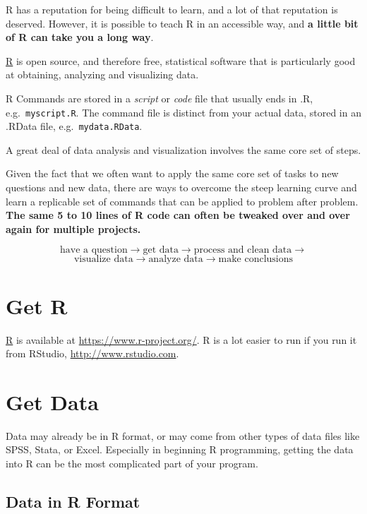 \documentclass[
  letterpaper,
  DIV=11,
  numbers=noendperiod]{scrreprt}
\begin{document}
R has a reputation for being difficult to learn, and a lot of that
reputation is deserved. However, it is possible to teach R in an
accessible way, and \textbf{a little bit of R can take you a long way}.

\href{https://www.r-project.org/}{R} is open source, and therefore free,
statistical software that is particularly good at obtaining, analyzing
and visualizing data.

R Commands are stored in a \emph{script} or \emph{code} file that
usually ends in .R, e.g.~\texttt{myscript.R}. The command file is
distinct from your actual data, stored in an .RData file,
e.g.~\texttt{mydata.RData}.

A great deal of data analysis and visualization involves the same core
set of steps.

Given the fact that we often want to apply the same core set of tasks to
new questions and new data, there are ways to overcome the steep
learning curve and learn a replicable set of commands that can be
applied to problem after problem. \textbf{The same 5 to 10 lines of R
code can often be tweaked over and over again for multiple projects.}

\[\text{have a question} \rightarrow \text{get data} \rightarrow \text{process and clean data} \rightarrow\]
\[\text{visualize data} \rightarrow \text{analyze data} \rightarrow \text{make conclusions}\]

\hypertarget{get-r}{%
\section{Get R}\label{get-r}}

\href{https://www.r-project.org/}{R} is available at
\url{https://www.r-project.org/}. R is a lot easier to run if you run it
from RStudio, \url{http://www.rstudio.com}.

\hypertarget{get-data}{%
\section{Get Data}\label{get-data}}

Data may already be in R format, or may come from other types of data
files like SPSS, Stata, or Excel. Especially in beginning R programming,
getting the data into R can be the most complicated part of your
program.

\hypertarget{data-in-r-format}{%
\subsection{Data in R Format}\label{data-in-r-format}}
\end{document}
